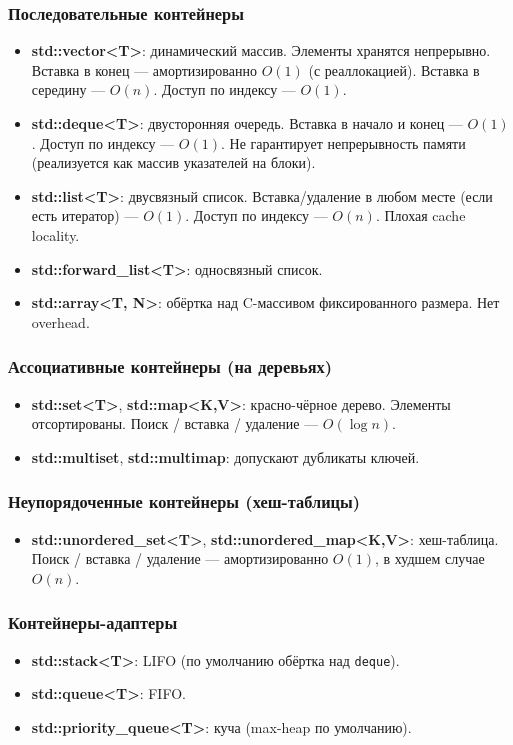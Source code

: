 \documentclass[12pt,a4paper]{article}
\begin{document}
\subsubsection{Последовательные контейнеры}
\begin{itemize}
    \item \textbf{std::vector<T>}: динамический массив. Элементы хранятся непрерывно. Вставка в конец --- амортизированно $O(1)$ (с реаллокацией). Вставка в середину --- $O(n)$. Доступ по индексу --- $O(1)$.
    \item \textbf{std::deque<T>}: двусторонняя очередь. Вставка в начало и конец --- $O(1)$. Доступ по индексу --- $O(1)$. Не гарантирует непрерывность памяти (реализуется как массив указателей на блоки).
    \item \textbf{std::list<T>}: двусвязный список. Вставка/удаление в любом месте (если есть итератор) --- $O(1)$. Доступ по индексу --- $O(n)$. Плохая cache locality.
    \item \textbf{std::forward\_list<T>}: односвязный список.
    \item \textbf{std::array<T, N>}: обёртка над C-массивом фиксированного размера. Нет overhead.
\end{itemize}

\subsubsection{Ассоциативные контейнеры (на деревьях)}
\begin{itemize}
    \item \textbf{std::set<T>}, \textbf{std::map<K,V>}: красно-чёрное дерево. Элементы отсортированы. Поиск / вставка / удаление --- $O(\log n)$.
    \item \textbf{std::multiset}, \textbf{std::multimap}: допускают дубликаты ключей.
\end{itemize}

\subsubsection{Неупорядоченные контейнеры (хеш-таблицы)}
\begin{itemize}
    \item \textbf{std::unordered\_set<T>}, \textbf{std::unordered\_map<K,V>}: хеш-таблица. Поиск / вставка / удаление --- амортизированно $O(1)$, в худшем случае $O(n)$.
\end{itemize}

\subsubsection{Контейнеры-адаптеры}
\begin{itemize}
    \item \textbf{std::stack<T>}: LIFO (по умолчанию обёртка над \texttt{deque}).
    \item \textbf{std::queue<T>}: FIFO.
    \item \textbf{std::priority\_queue<T>}: куча (max-heap по умолчанию).
\end{itemize}
\end{document}
